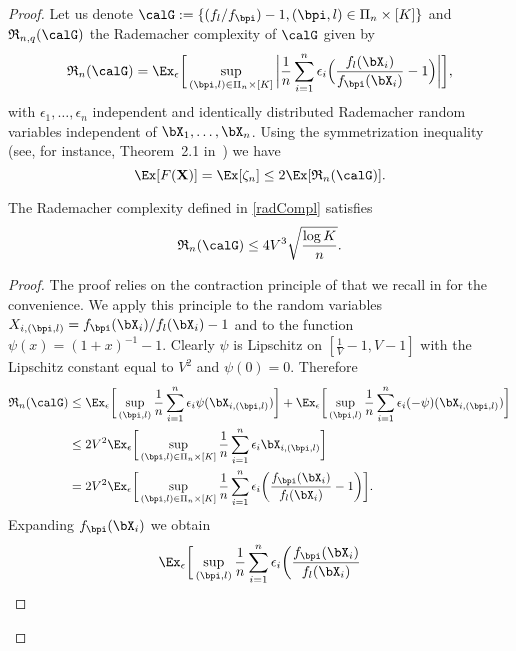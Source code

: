 \begin{proof}
Let us denote $\calG:=\{(f_l/f_{\bpi})-1, (\bpi,l)\in\Pi_n\times [K]\}$ and $\mathfrak{R}_{n,q}(\calG)$ the Rademacher
complexity of $\calG$ given by
\begin{equation}
\label{radCompl}
  \mathfrak{R}_{n}(\calG) = \Ex_{\epsilon}\bigg[ \sup_{(\bpi,l)\in\Pi_n\times[K]}\bigg| \frac{1}{n}\sum_{i=1}^n
  \epsilon_i\Big(\frac{f_l(\bX_i)}{f_{\bpi}(\bX_i)}-1\Big)\bigg| \bigg],
\end{equation}
with $\epsilon_1,\dots,\epsilon_n$ independent and identically distributed Rademacher random variables independent
of $\bX_1,\dots,\bX_n$. Using the symmetrization inequality (see, for instance, Theorem~2.1 in~\cite{KoltBook2011})
we have
\begin{equation}
\label{rademacher}
  \Ex[F(\mathbf X)] = \Ex[\zeta_n] \leq 2\Ex[\mathfrak{R}_{n}(\calG)].
\end{equation}
\begin{lemma}
\label{boundRademComplex}
The Rademacher complexity defined in \eqref{radCompl} satisfies
\begin{equation}
\mathfrak{R}_n(\calG) \leq  4V^3\sqrt{\frac{\log K}{n}}.
\end{equation}
\end{lemma}
\begin{proof}
The proof relies on the contraction principle of \cite{LedouxTal:91} that we recall in
 for the convenience. We apply this principle to the random variables
$X_{i,(\bpi,l)}=f_{\bpi}(\bX_i)/f_l(\bX_i)-1$ and to the function $\psi(x) = (1+x)^{-1}-1$.
Clearly $\psi$ is Lipschitz on
$[\frac{1}{V}-1,V-1]$ with the Lipschitz constant equal to $V^2$ and $\psi(0)=0$. Therefore
\begin{align}
   \mathfrak{R}_{n}(\calG)
			& \le  \Ex_{\epsilon}\bigg[ \sup_{(\bpi,l)} \frac{1}{n}\sum_{i=1}^n
                \epsilon_i\psi(\bX_{i,(\bpi,l)})\bigg]
                +\Ex_{\epsilon}\bigg[ \sup_{(\bpi,l)}\frac{1}{n}\sum_{i=1}^n
                \epsilon_i(-\psi)(\bX_{i,(\bpi,l)})\bigg]\\
			&\leq 2V^2\Ex_{\epsilon}\bigg[ \sup_{(\bpi,l)\in\Pi_n\times[K]}\frac{1}{n}
                \sum_{i=1}^n \epsilon_i \bX_{i,(\bpi,l)} \bigg]\\
			&= 2V^2 \Ex_{\epsilon}\bigg[ \sup_{(\bpi,l)\in\Pi_n\times[K]}\frac{1}{n}\sum_{i=1}^n \epsilon_i
					\bigg(\frac{f_{\bpi}(\bX_i)}{f_l(\bX_i)} -1\bigg) \bigg].
\end{align}
Expanding $f_{\bpi}(\bX_i)$ we obtain
\begin{align}
\Ex_{\epsilon}\bigg[ \sup_{(\bpi,l)}\frac{1}{n}\sum_{i=1}^n \epsilon_i \bigg(\frac{f_{\bpi}(\bX_i)}{f_l(\bX_i)}

\end{align}
\end{proof}
\end{proof}
